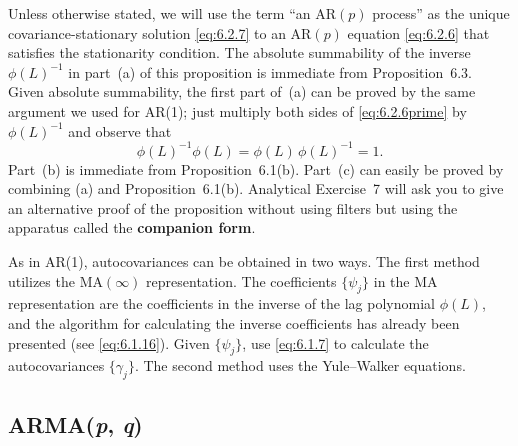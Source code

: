 Unless otherwise stated, we will use the term ``an $\text{AR}(p)$ process'' as the unique
covariance-stationary solution \eqref{eq:6.2.7} to an $\text{AR}(p)$ equation \eqref{eq:6.2.6} that satisfies the
stationarity condition. The absolute summability of the inverse $\phi(L)^{-1}$ in part~(a)
of this proposition is immediate from Proposition~6.3. Given absolute summability,
the first part of~(a) can be proved by the same argument we used for AR(1); just
multiply both sides of \eqref{eq:6.2.6prime} by $\phi(L)^{-1}$ and observe that
\[
  \phi(L)^{-1} \phi(L) = \phi(L)\,\phi(L)^{-1} = 1.
\]
Part~(b) is immediate from Proposition~6.1(b). Part~(c) can easily be proved by
combining (a) and Proposition~6.1(b). Analytical Exercise~7 will ask you to give
an alternative proof of the proposition without using filters but using the apparatus
called the \textbf{companion form}.

As in AR(1), autocovariances can be obtained in two ways. The first method
utilizes the $\text{MA}(\infty)$ representation. The coefficients $\{\psi_j\}$ in the MA representation
are the coefficients in the inverse of the lag polynomial $\phi(L)$, and the algorithm for
calculating the inverse coefficients has already been presented (see \eqref{eq:6.1.16}). Given
$\{\psi_j\}$, use \eqref{eq:6.1.7} to calculate the autocovariances $\{\gamma_j\}$. The second method uses the
Yule--Walker equations.

\subsection*{ARMA(\textit{p}, \textit{q})}

